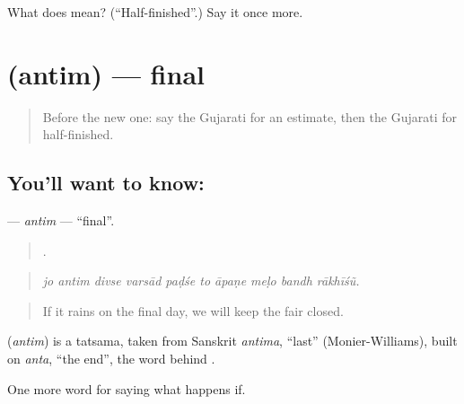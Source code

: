 \begin{tcolorbox}[breakable,colback=teal!4,colframe=teal!35!black,title={Before you move on}]
What does  mean? (\textquotedblleft{}Half-finished\textquotedblright{}.) Say it once more.
\end{tcolorbox}
\section[\texorpdfstring{\gu{અંતિમ} (antim)}{અંતિમ (antim)}]{ (antim) — final}

\label{lesson:GU-C529-antim}



\begin{quote}
Before the new one: say the Gujarati for an estimate, then the Gujarati for half-finished.
\end{quote}

\subsection*{You'll want to know: }
\textbf{} — \emph{antim} — \textquotedblleft{}final\textquotedblright{}.

\begin{quote}
         .
\end{quote}

\begin{quote}
\emph{jo antim divse varsād paḍśe to āpaṇe meḷo bandh rākhīśũ.}
\end{quote}

\begin{quote}
If it rains on the final day, we will keep the fair closed.
\end{quote}

\begin{cousinweb}
\textbf{} (\emph{antim}) is a tatsama, taken from Sanskrit \emph{antima}, \textquotedblleft{}last\textquotedblright{} (Monier-Williams), built on \emph{anta}, \textquotedblleft{}the end\textquotedblright{}, the word behind \textbf{}.
\end{cousinweb}

\begin{grammarlens}[title={What you've built}]
One more word for saying what happens if.
\end{grammarlens}

